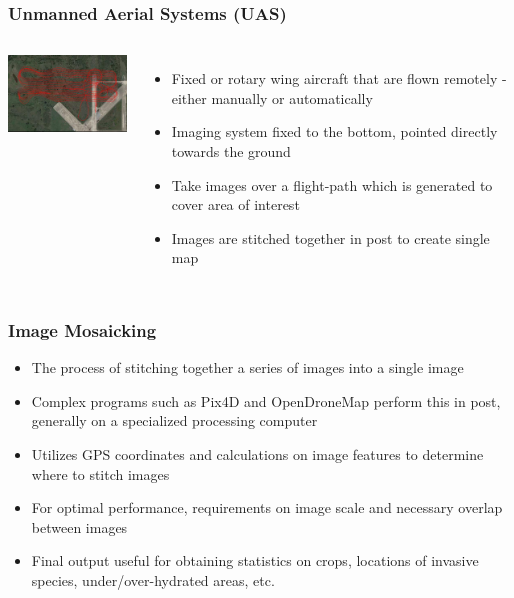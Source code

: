 \documentclass{beamer}
\begin{document}
\begin{frame}
\frametitle{Unmanned Aerial Systems (UAS)}
\begin{columns}
    \begin{center}
      \includegraphics[width=5cm]{Figures/flightpath}
    \end{center}
    \begin{itemize}
      \item Fixed or rotary wing aircraft that are flown remotely - either manually or automatically
      \item Imaging system fixed to the bottom, pointed directly towards the ground
      \item Take images over a flight-path which is generated to cover area of interest
      \item Images are stitched together in post to create single map
    \end{itemize}
\end{columns}
\end{frame}


\begin{frame}
\frametitle{Image Mosaicking}
\begin{itemize}
  \item The process of stitching together a series of images into a single image
  \item Complex programs such as Pix4D and OpenDroneMap perform this in post, generally on a specialized processing computer
  \item Utilizes GPS coordinates and calculations on image features to determine where to stitch images
  \item For optimal performance, requirements on image scale and necessary overlap between images
  \item Final output useful for obtaining statistics on crops, locations of invasive species, under/over-hydrated areas, etc.
\end{itemize}
\end{frame}
\end{document}
